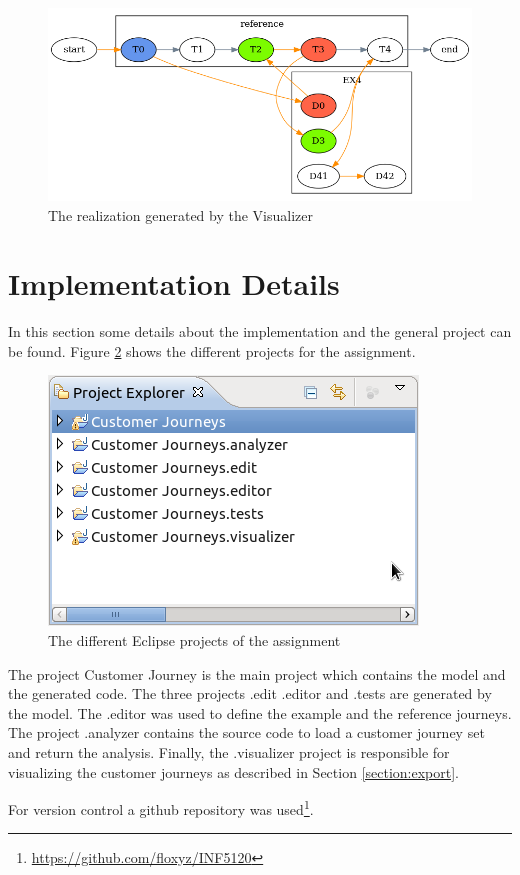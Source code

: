 \documentclass[12pt]{scrartcl}
\begin{document}
\begin{figure}[hbtp]
	\centering
	\includegraphics[scale=0.5]{img/sample_journey2.png}
	\caption{The realization generated by the Visualizer}
	\label{figure:sample_figure2}
\end{figure}

\section{Implementation Details}
\label{section:impl}

In this section some details about the implementation and the general project can be found. Figure 
\ref{figure:projects} shows the different projects for the assignment.

\begin{figure}[hbtp]
	\centering
	\includegraphics[scale=0.7]{img/projectexplorer.png}
	\caption{The different Eclipse projects of the assignment}
	\label{figure:projects}
\end{figure}

The project Customer Journey is the main project which contains the model and the generated code. The three
projects .edit .editor and .tests are generated by the model. The .editor was used to define the example and
the reference journeys. The project .analyzer contains the source code to load a customer journey set and
return the analysis. Finally, the .visualizer project is responsible for visualizing the customer journeys as 
described in Section \ref{section:export}.

For version control a github repository was used\footnote{\url{https://github.com/floxyz/INF5120}}.
\end{document}
